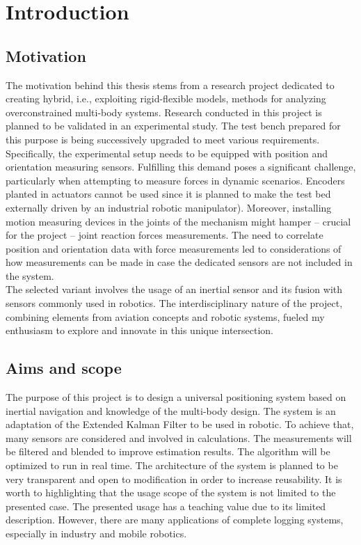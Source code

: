 \chapter{Introduction}

\section{Motivation}

The motivation behind this thesis stems from a research project dedicated to creating hybrid, i.e., exploiting rigid-flexible models, methods for analyzing overconstrained multi-body systems. Research conducted in this project is planned to be validated in an experimental study. The test bench prepared for this purpose is being successively upgraded to meet various requirements. Specifically, the experimental setup needs to be equipped with position and orientation measuring sensors. Fulfilling this demand poses a significant challenge, particularly when attempting to measure forces in dynamic scenarios. Encoders planted in actuators cannot be used since it is planned to make the test bed externally driven by an industrial robotic manipulator). Moreover, installing motion measuring devices in the joints of the mechanism might hamper -- crucial for the project -- joint reaction forces measurements. The need to correlate position and orientation data with force measurements led to considerations of how measurements can be made in case the dedicated sensors are not included in the system.\\

The selected variant involves the usage of an inertial sensor and its fusion with sensors commonly used in robotics. The interdisciplinary nature of the project, combining elements from aviation concepts and robotic systems, fueled my enthusiasm to explore and innovate in this unique intersection.

\newpage
\section{Aims and scope}

The purpose of this project is to design a universal positioning system based on inertial navigation and knowledge of the multi-body design. The system is an adaptation of the Extended Kalman Filter to be used in robotic. To achieve that, many sensors are considered and involved in calculations. The measurements will be filtered and blended to improve estimation results. The algorithm will be optimized to run in real time. The architecture of the system is planned to be very transparent and open to modification in order to increase reusability. It is worth to highlighting that the usage scope of the system is not limited to the presented case. The presented usage has a teaching value due to its limited description. However, there are many applications of complete logging systems, especially in industry and mobile robotics.\\

